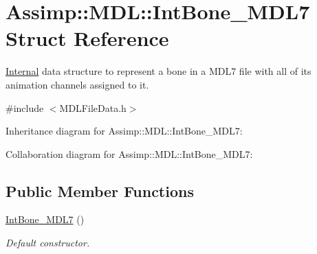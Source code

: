 \hypertarget{struct_assimp_1_1_m_d_l_1_1_int_bone___m_d_l7}{\section{Assimp\+:\+:M\+D\+L\+:\+:Int\+Bone\+\_\+\+M\+D\+L7 Struct Reference}
\label{struct_assimp_1_1_m_d_l_1_1_int_bone___m_d_l7}
}


\hyperlink{struct_internal}{Internal} data structure to represent a bone in a M\+D\+L7 file with all of its animation channels assigned to it.  




{\ttfamily \#include $<$M\+D\+L\+File\+Data.\+h$>$}



Inheritance diagram for Assimp\+:\+:M\+D\+L\+:\+:Int\+Bone\+\_\+\+M\+D\+L7\+:


Collaboration diagram for Assimp\+:\+:M\+D\+L\+:\+:Int\+Bone\+\_\+\+M\+D\+L7\+:
\subsection*{Public Member Functions}
\begin{DoxyCompactItemize}
\item 
\hypertarget{struct_assimp_1_1_m_d_l_1_1_int_bone___m_d_l7_a00a84c68f38a95a49dfa8b8381b81418}{\hyperlink{struct_assimp_1_1_m_d_l_1_1_int_bone___m_d_l7_a00a84c68f38a95a49dfa8b8381b81418}{Int\+Bone\+\_\+\+M\+D\+L7} ()}\label{struct_assimp_1_1_m_d_l_1_1_int_bone___m_d_l7_a00a84c68f38a95a49dfa8b8381b81418}

\begin{DoxyCompactList}\small\item\em Default constructor. \end{DoxyCompactList}\end{DoxyCompactItemize}
